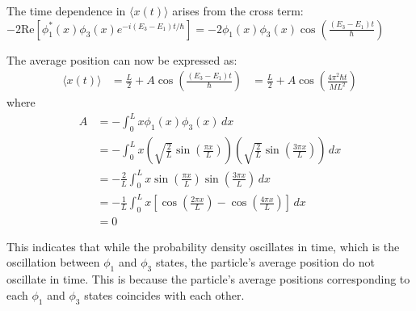 \documentclass{article}
\begin{document}
\begin{adjustwidth}{5pt}{5pt}
\noindent The time dependence in $\langle x(t) \rangle$ arises from the cross term:
$-2 \text{Re} \left[ \phi_1^*(x) \phi_3(x) e^{-i(E_3 - E_1)t/\hbar} \right] = -2 \phi_1(x) \phi_3(x) \cos\left( \frac{(E_3 - E_1) t}{\hbar} \right)$

\noindent The average position can now be expressed as:
\[
\begin{aligned}
\langle x(t) \rangle &= \frac{L}{2} + A \cos\left( \frac{(E_3 - E_1) t}{\hbar} \right)
&= \frac{L}{2} + A \cos\left( \frac{4 \pi^2 \hbar t}{M L^2} \right)
\end{aligned}\]
where
\[
\begin{aligned}
A &= -\int_0^L x \phi_1(x) \phi_3(x) \, dx \\
&= -\int_0^L x \left( \sqrt{\frac{2}{L}} \sin\left(\frac{\pi x}{L}\right) \right) \left( \sqrt{\frac{2}{L}} \sin\left(\frac{3\pi x}{L}\right) \right) \, dx \\
&= -\frac{2}{L} \int_0^L x \sin\left(\frac{\pi x}{L}\right) \sin\left(\frac{3\pi x}{L}\right) \, dx \\
&= -\frac{1}{L} \int_0^L x \left[ \cos\left(\frac{2\pi x}{L}\right) - \cos\left(\frac{4\pi x}{L}\right) \right] \, dx \\
&= 0
\end{aligned}
\]

\noindent This indicates that while the probability density oscillates in time, which is the oscillation between $\phi_1$ and $\phi_3$ states, the particle's average position do not oscillate in time. This is because the particle's average positions corresponding to each $\phi_1$ and $\phi_3$ states coincides with each other.
\end{adjustwidth}
\end{document}
